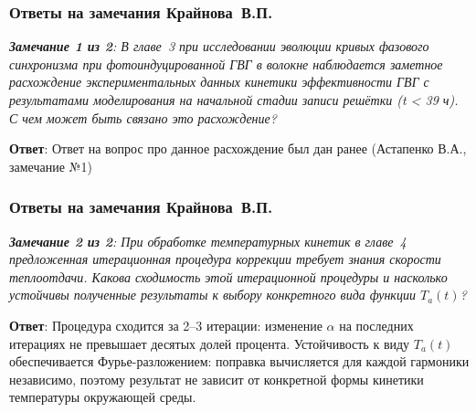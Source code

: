 \begin{frame}
	\frametitle{Ответы на замечания Крайнова~В.П.}
	\small{\textit{\textbf{Замечание 1 из 2}: В главе~3 при исследовании эволюции кривых фазового синхронизма при фотоиндуцированной ГВГ в волокне наблюдается заметное расхождение экспериментальных данных кинетики эффективности ГВГ с результатами моделирования на начальной стадии записи решётки (t < 39 ч). С чем может быть связано это расхождение?}}
	
	\hfill
	
	\textbf{Ответ}: Ответ на вопрос про данное расхождение был дан ранее (Астапенко В.А., замечание №1)

\end{frame}

\begin{frame}
	\frametitle{Ответы на замечания Крайнова~В.П.}
	\small{\textit{\textbf{Замечание 2 из 2}: При обработке температурных кинетик в главе~4 предложенная итерационная процедура коррекции требует знания скорости теплоотдачи. Какова сходимость этой итерационной процедуры и насколько устойчивы полученные результаты к выбору конкретного вида функции $T_{a}(t)$?}}
	
	\hfill
	
	\textbf{Ответ}: Процедура сходится за 2–3 итерации: изменение $\alpha$ на последних итерациях не превышает десятых долей процента. Устойчивость к виду $T_{a}(t)$ обеспечивается Фурье-разложением: поправка вычисляется для каждой гармоники независимо, поэтому результат не зависит от конкретной формы кинетики температуры окружающей среды.
\end{frame}